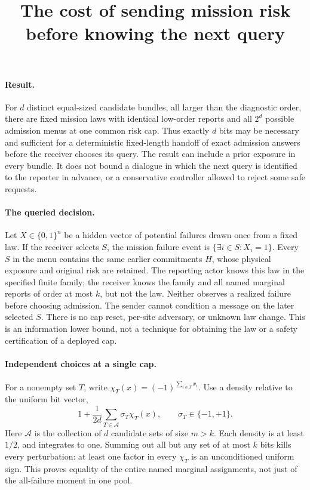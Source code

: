 \documentclass{article}
\title{The cost of sending mission risk before knowing the next query}
\begin{document}
\maketitle

\paragraph{Result.}
For \(d\) distinct equal-sized candidate bundles, all larger than
the diagnostic order, there are fixed mission laws with identical
low-order reports and all \(2^d\) possible admission menus at one
common risk cap. Thus exactly \(d\) bits may be necessary and sufficient
for a deterministic fixed-length handoff of exact admission answers
before the receiver chooses its query. The result can include
a prior exposure in every bundle. It does not bound a dialogue
in which the next query is identified to the reporter in advance,
or a conservative controller allowed to reject some safe requests.

\paragraph{The queried decision.}
Let \(X\in\{0,1\}^n\) be a hidden vector of potential failures
drawn once from a fixed law. If the receiver selects \(S\), the
mission failure event is \(\{\exists i\in S:X_i=1\}\).
Every \(S\) in the menu contains the same earlier commitments
\(H\), whose physical exposure and original risk are retained.
The reporting actor knows this law in the specified finite family;
the receiver knows the family and all named marginal reports
of order at most \(k\), but not the law.
Neither observes a realized failure before choosing admission.
The sender cannot condition a message on the later selected \(S\).
There is no cap reset, per-site adversary, or unknown law change.
This is an information lower bound, not a technique for obtaining
the law or a safety certification of a deployed cap.

\paragraph{Independent choices at a single cap.}
For a nonempty set \(T\), write
\(\chi_T(x)=(-1)^{\sum_{i\in T} x_i}\).
Use a density relative to the uniform bit vector,
\[
         1+\frac{1}{2d}\sum_{T\in\mathcal A}\sigma_T\chi_T(x),
         \qquad \sigma_T\in\{-1,+1\}.
\]
Here \(\mathcal A\) is the collection of \(d\) candidate sets
of size \(m>k\). Each density is at least \(1/2\),
and integrates to one. Summing out all but any set of
at most \(k\) bits kills every perturbation: at least one
factor in every \(\chi_T\) is an unconditioned uniform sign.
This proves equality of the entire named marginal assignments,
not just of the all-failure moment in one pool.
\end{document}
